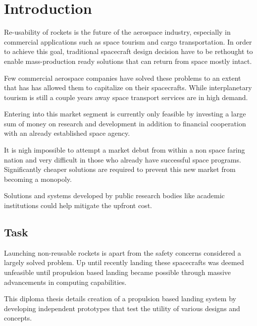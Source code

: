 \chapter{Introduction}

Re-usability of rockets is the future of the aerospace industry, especially in commercial applications such as space tourism and cargo transportation. In order to achieve this goal, traditional spacecraft design decision have to be rethought to enable mass-production ready solutions that can return from space mostly intact. 

Few commercial aerospace companies have solved these problems to an extent that has has allowed them to capitalize on their spacecrafts. While interplanetary tourism is still a couple years away space transport services are in high demand.

Entering into this market segment is currently only feasible by investing a large sum of money on research and development in addition to financial cooperation with an already established space agency.

It is nigh impossible to attempt a market debut from within a non space faring nation and very difficult in those who already have successful space programs. Significantly cheaper solutions are required to prevent this new market from becoming a monopoly.

Solutions and systems developed by public research bodies like academic institutions could help mitigate the upfront cost.

\section{Task}

Launching non-reusable rockets is apart from the safety concerns considered a largely solved problem. Up until recently landing these spacecrafts was deemed unfeasible until propulsion based landing became possible through massive advancements in computing capabilities. 

This diploma thesis details creation of a propulsion based landing system by developing independent prototypes that test the utility of various designs and concepts.